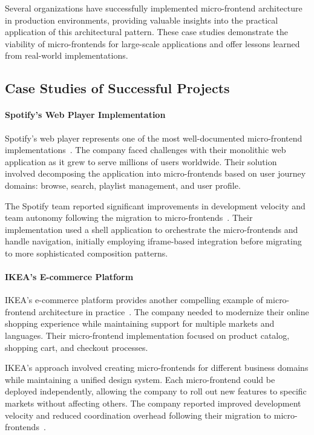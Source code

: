\documentclass[12pt,a4paper]{report}
\begin{document}
Several organizations have successfully implemented micro-frontend architecture in production environments, providing valuable insights into the practical application of this architectural pattern. These case studies demonstrate the viability of micro-frontends for large-scale applications and offer lessons learned from real-world implementations.

\subsection{Case Studies of Successful Projects}

\paragraph{Spotify's Web Player Implementation}

Spotify's web player represents one of the most well-documented micro-frontend implementations~\cite{spotify2019microfrontends}. The company faced challenges with their monolithic web application as it grew to serve millions of users worldwide. Their solution involved decomposing the application into micro-frontends based on user journey domains: browse, search, playlist management, and user profile.

The Spotify team reported significant improvements in development velocity and team autonomy following the migration to micro-frontends~\cite{spotify2019microfrontends}. Their implementation used a shell application to orchestrate the micro-frontends and handle navigation, initially employing iframe-based integration before migrating to more sophisticated composition patterns.

\paragraph{IKEA's E-commerce Platform}

IKEA's e-commerce platform provides another compelling example of micro-frontend architecture in practice~\cite{ikea2020microfrontends}. The company needed to modernize their online shopping experience while maintaining support for multiple markets and languages. Their micro-frontend implementation focused on product catalog, shopping cart, and checkout processes.

IKEA's approach involved creating micro-frontends for different business domains while maintaining a unified design system. Each micro-frontend could be deployed independently, allowing the company to roll out new features to specific markets without affecting others. The company reported improved development velocity and reduced coordination overhead following their migration to micro-frontends~\cite{ikea2020microfrontends}.
\end{document}
